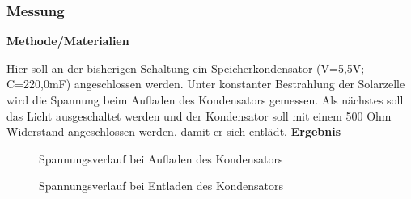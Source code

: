     \subsubsection{Messung}                                             %
        \textbf{Methode/Materialien}
        \newline
        \par Hier soll an der bisherigen Schaltung ein Speicherkondensator (V=5,5V; C=220,0mF) angeschlossen
        werden. Unter konstanter Bestrahlung der Solarzelle wird die Spannung beim Aufladen des
        Kondensators gemessen. Als nächstes soll das Licht ausgeschaltet werden und der Kondensator soll mit
        einem 500 Ohm Widerstand angeschlossen werden, damit er sich entlädt.
        \vspace{4mm}
        \newline
        \textbf{Ergebnis}
        \newline
        \par
        \begin{figure}[H]
            \def\svgwidth{\textwidth}
            
            
            \caption{Spannungsverlauf bei Aufladen des Kondensators}
        \end{figure}
        \begin{figure}[H]
            \def\svgwidth{\textwidth}
            
            
            \caption{Spannungsverlauf bei Entladen des Kondensators}
        \end{figure}
        
        \clearpage
